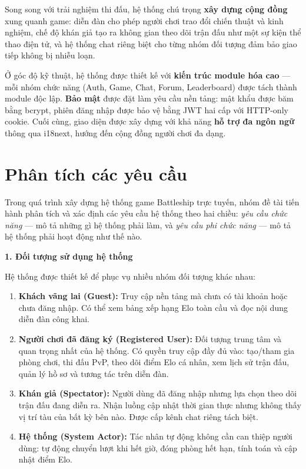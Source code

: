 \documentclass[13pt, a4paper]{extreport}
\begin{document}
Song song với trải nghiệm thi đấu, hệ thống chú trọng \textbf{xây dựng cộng đồng} xung quanh
game: diễn đàn cho phép người chơi trao đổi chiến thuật và kinh nghiệm, chế độ khán giả tạo ra
không gian theo dõi trận đấu như một sự kiện thể thao điện tử, và hệ thống chat riêng biệt cho
từng nhóm đối tượng đảm bảo giao tiếp không bị nhiễu loạn.

Ở góc độ kỹ thuật, hệ thống được thiết kế với \textbf{kiến trúc module hóa cao} — mỗi nhóm chức
năng (Auth, Game, Chat, Forum, Leaderboard) được tách thành module độc lập. \textbf{Bảo mật} được
đặt làm yêu cầu nền tảng: mật khẩu được băm bằng bcrypt, phiên đăng nhập được bảo vệ bằng JWT hai
cấp với HTTP-only cookie. Cuối cùng, giao diện được xây dựng với khả năng \textbf{hỗ trợ đa ngôn
ngữ} thông qua i18next, hướng đến cộng đồng người chơi đa dạng.

\section{Phân tích các yêu cầu}

Trong quá trình xây dựng hệ thống game Battleship trực tuyến, nhóm đề tài tiến hành phân tích và
xác định các yêu cầu hệ thống theo hai chiều: \textit{yêu cầu chức năng} — mô tả những gì hệ thống
phải làm, và \textit{yêu cầu phi chức năng} — mô tả hệ thống phải hoạt động như thế nào.

\textbf{1. Đối tượng sử dụng hệ thống}

Hệ thống được thiết kế để phục vụ nhiều nhóm đối tượng khác nhau:

\begin{enumerate}[label=\alph*.]
  \item \textbf{Khách vãng lai (Guest):} Truy cập nền tảng mà chưa có tài khoản hoặc chưa đăng
    nhập. Có thể xem bảng xếp hạng Elo toàn cầu và đọc nội dung diễn đàn công khai.

  \item \textbf{Người chơi đã đăng ký (Registered User):} Đối tượng trung tâm và quan trọng nhất
    của hệ thống. Có quyền truy cập đầy đủ vào: tạo/tham gia phòng chơi, thi đấu PvP, theo dõi
    điểm Elo cá nhân, xem lịch sử trận đấu, quản lý hồ sơ và tương tác trên diễn đàn.

  \item \textbf{Khán giả (Spectator):} Người dùng đã đăng nhập nhưng lựa chọn theo dõi trận đấu
    đang diễn ra. Nhận luồng cập nhật thời gian thực nhưng không thấy vị trí tàu của bất kỳ bên
    nào. Được cấp kênh chat riêng tách biệt.

  \item \textbf{Hệ thống (System Actor):} Tác nhân tự động không cần can thiệp người dùng: tự
    động chuyển lượt khi hết giờ, đóng phòng hết hạn, tính toán và cập nhật điểm Elo.
\end{enumerate}
\end{document}
